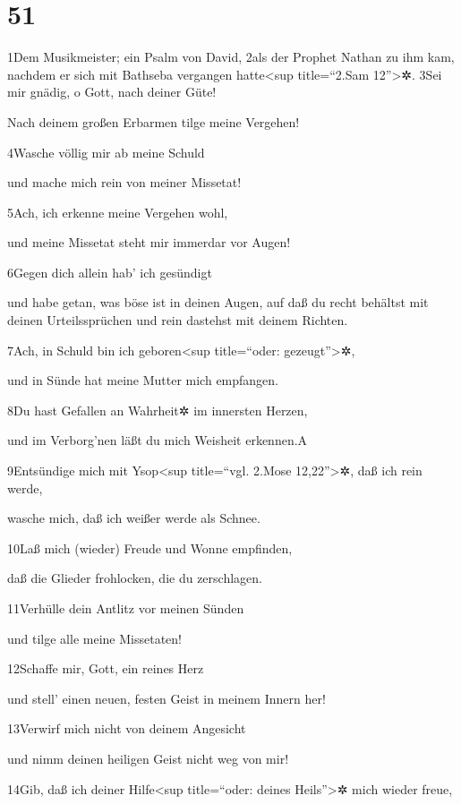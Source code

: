 \hypertarget{section-50}{%
\section{51}\label{section-50}}

1Dem Musikmeister; ein Psalm von David, 2als der Prophet Nathan zu ihm
kam, nachdem er sich mit Bathseba vergangen hatte\textless sup
title=``2.Sam 12''\textgreater✲. 3Sei mir gnädig, o Gott, nach deiner
Güte!

Nach deinem großen Erbarmen tilge meine Vergehen!

4Wasche völlig mir ab meine Schuld

und mache mich rein von meiner Missetat!

5Ach, ich erkenne meine Vergehen wohl,

und meine Missetat steht mir immerdar vor Augen!

6Gegen dich allein hab' ich gesündigt

und habe getan, was böse ist in deinen Augen, auf daß du recht behältst
mit deinen Urteilssprüchen und rein dastehst mit deinem Richten.

7Ach, in Schuld bin ich geboren\textless sup title=``oder:
gezeugt''\textgreater✲,

und in Sünde hat meine Mutter mich empfangen.

8Du hast Gefallen an Wahrheit✲ im innersten Herzen,

und im Verborg'nen läßt du mich Weisheit erkennen.{A}

9Entsündige mich mit Ysop\textless sup title=``vgl. 2.Mose
12,22''\textgreater✲, daß ich rein werde,

wasche mich, daß ich weißer werde als Schnee.

10Laß mich (wieder) Freude und Wonne empfinden,

daß die Glieder frohlocken, die du zerschlagen.

11Verhülle dein Antlitz vor meinen Sünden

und tilge alle meine Missetaten!

12Schaffe mir, Gott, ein reines Herz

und stell' einen neuen, festen Geist in meinem Innern her!

13Verwirf mich nicht von deinem Angesicht

und nimm deinen heiligen Geist nicht weg von mir!

14Gib, daß ich deiner Hilfe\textless sup title=``oder: deines
Heils''\textgreater✲ mich wieder freue,

